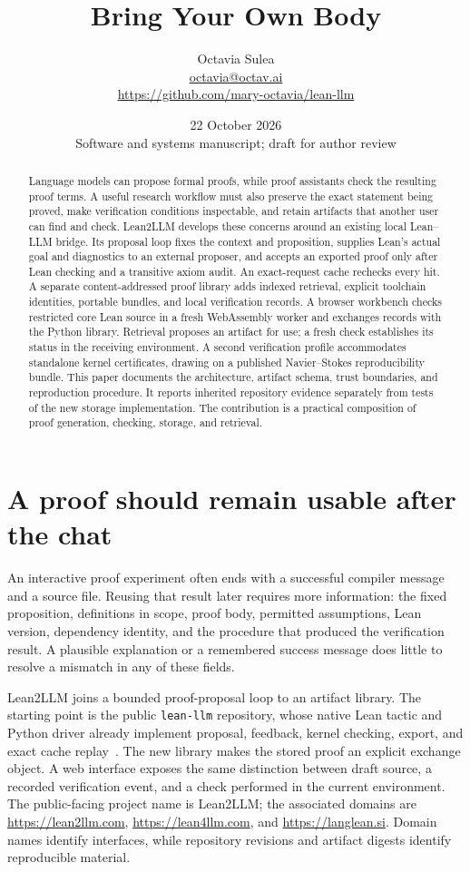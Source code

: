 \documentclass[10pt,a4paper]{article}
\title{Bring Your Own Body}
\author{Octavia Sulea\\\small\href{mailto:octavia@octav.ai}{octavia@octav.ai}\\
  \small\url{https://github.com/mary-octavia/lean-llm}}
\date{22 October 2026\\\small Software and systems manuscript; draft for author review}
\newcommand{\code}[1]{\texttt{#1}}
\begin{document}
\maketitle
\begin{abstract}
Language models can propose formal proofs, while proof assistants check the
resulting proof terms. A useful research workflow must also preserve the exact
statement being proved, make verification conditions inspectable, and retain
artifacts that another user can find and check. Lean2LLM develops these concerns
around an existing local Lean--LLM bridge. Its proposal loop fixes the context
and proposition, supplies Lean's actual goal and diagnostics to an external
proposer, and accepts an exported proof only after Lean checking and a
transitive axiom audit. An exact-request cache rechecks every hit. A separate
content-addressed proof library adds indexed retrieval, explicit toolchain
identities, portable bundles, and local verification records. A browser
workbench checks restricted core Lean source in a fresh WebAssembly worker
and exchanges records with the Python library. Retrieval proposes
an artifact for use; a fresh check establishes its status in the receiving
environment. A second verification profile accommodates standalone kernel
certificates, drawing on a published Navier--Stokes reproducibility bundle.
This paper documents the architecture, artifact schema, trust boundaries, and
reproduction procedure. It reports inherited repository evidence separately
from tests of the new storage implementation. The contribution is a practical
composition of proof generation, checking, storage, and retrieval.
\end{abstract}

\section{A proof should remain usable after the chat}
An interactive proof experiment often ends with a successful compiler message
and a source file. Reusing that result later requires more information: the
fixed proposition, definitions in scope, proof body, permitted assumptions,
Lean version, dependency identity, and the procedure that produced the
verification result. A plausible explanation or a remembered success message
does little to resolve a mismatch in any of these fields.

Lean2LLM joins a bounded proof-proposal loop to an artifact library. The starting
point is the public \code{lean-llm} repository, whose native Lean tactic and Python
driver already implement proposal, feedback, kernel checking, export, and exact
cache replay~\cite{sulea-bridge}. The new library makes the stored proof an
explicit exchange object. A web interface exposes the same distinction between
draft source, a recorded verification event, and a check performed in the current
environment. The public-facing project name is Lean2LLM; the associated domains
are \url{https://lean2llm.com}, \url{https://lean4llm.com}, and
\url{https://langlean.si}. Domain names identify interfaces, while repository
revisions and artifact digests identify reproducible material.
\end{document}
